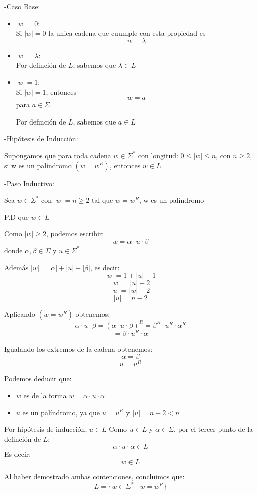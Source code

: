 -Caso Base:
\begin{itemize}
\item $|w|=0$: \\
Si $|w|=0$ la unica cadena que cuumple con esta propiedad es 
$$w=\lambda$$

\item $|w|=\lambda$: \\
Por definción de $L$, sabemos que $\lambda\in L$

\item $|w|=1$: \\
Si $|w|=1$, entonces 
$$w=a$$
para $a\in\Sigma$.

Por definción de $L$, sabemos que $a\in L$ 

\end{itemize}

-Hipótesis de Inducción:

Supongamos que para roda cadena $w\in\Sigma^{*}$ con longitud:
$ 0 \leq |w| \leq n$, con $n \geq 2$, si w es un palíndromo $(w =w^{R})$, entonces $w\in L$.

-Paso Inductivo:

Sea $w\in\Sigma^{*}$ con $|w|= n\geq 2$ tal que $w=w^{R}$, w es un palíndromo

P.D que $w\in L$

Como $|w| \geq 2$, podemos escribir:
$$w = \alpha \cdot u \cdot \beta$$ donde $\alpha,\beta\in\Sigma$ y $u\in\Sigma^{*}$

Además $|w| = |\alpha| + |u| + |\beta|$, es decir:
$$|w| = 1 + |u| + 1$$
$$|w| = |u| + 2$$
$$|u| = |w| - 2$$
$$|u| = n - 2$$

Aplicando $(w = w^{R})$ obtenemos:
$$\alpha \cdot u \cdot \beta = (\alpha \cdot u \cdot \beta)^{R}= \beta^{R} \cdot u^{R} \cdot \alpha^{R}$$
$$= \beta \cdot u^{R} \cdot \alpha$$

Igualando los extremos de la cadena obtenemos:
$$\alpha = \beta$$
$$u = u^{R}$$

Podemos deducir que:
\begin{itemize}
    \item $w$ es de la forma $w = \alpha \cdot u \cdot \alpha$ 
    \item $u$ es un palíndromo, ya que $u = u^{R}$ y $|u| = n - 2 < n$
\end{itemize}

Por hipótesis de inducción, $u\in L$ 
Como $u \in L$ y $\alpha \in \Sigma$, por el tercer punto de la definción de $L$:
$$\alpha \cdot u \cdot \alpha \in L$$
Es decir:
$$w \in L$$

Al haber demostrado ambas contenciones, concluimos que:
$$L = \{w\in\Sigma^{*}\mid w=w^{R}\}$$